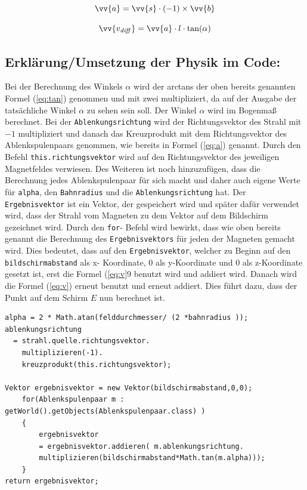 \begin{equation}
    \label{eq:a}
    \vv{a} = \vv{s} \cdot (-1) \times \vv{b}
\end{equation}

\begin{equation}
    \label{eq:v}
    \vv{v_\mathit{diff}} =  \vv{a} \cdot l \cdot \tan(\alpha)
\end{equation}

\subsection{Erklärung/Umsetzung der Physik im Code:}

Bei der Berechnung des Winkels $\alpha$ wird der arctans der oben bereits genannten Formel (\ref{eq:tan}) genommen und mit zwei multipliziert, da auf der Ausgabe der tatsächliche Winkel $\alpha$ zu sehen sein soll.
Der Winkel $\alpha$ wird im Bogenmaß berechnet.
Bei der \lstinline$Ablenkungsrichtung$ wird der Richtungsvektor des Strahl mit $-1$ multipliziert und danach das Kreuzprodukt mit dem Richtungsvektor des Ablenkspulenpaars genommen, wie bereits in Formel (\ref{eq:a}) genannt.
Durch den Befehl \lstinline$this.richtungsvektor$ wird auf den Richtungsvektor des jeweiligen Magnetfeldes verwiesen.
Des Weiteren ist noch hinzuzufügen, dass die Berechnung jedes Ablenkspulenpaar für sich macht und daher auch eigene Werte für \lstinline$alpha$, den \lstinline$Bahnradius$ und die \lstinline$Ablenkungsrichtung$ hat.
Der \lstinline$Ergebnisvektor$ ist ein Vektor, der gespeichert wird und später dafür verwendet wird, dass der Strahl vom Magneten zu dem Vektor auf dem Bildschirm gezeichnet wird.
Durch den \lstinline$for$- Befehl wird bewirkt, dass wie oben bereits genannt die Berechnung des \lstinline$Ergebnisvektors$ für jeden der Magneten gemacht wird.
Dies bedeutet, dass auf den \lstinline$Ergebnisvektor$, welcher zu Beginn auf den \lstinline$bildschirmabstand$ als x- Koordinate, $0$ als y-Koordinate und 0 als z-Koordinate gesetzt ist, erst die Formel (\ref{eq:v}9 benutzt wird und addiert wird.
Danach wird die Formel (\ref{eq:v}) erneut benutzt und erneut addiert. Dies führt dazu, dass der Punkt auf dem Schirm $E$ nun berechnet ist.

\begin{lstlisting}
alpha = 2 * Math.atan(felddurchmesser/ (2 *bahnradius ));
ablenkungsrichtung
  = strahl.quelle.richtungsvektor.
    multiplizieren(-1).
    kreuzprodukt(this.richtungsvektor);

Vektor ergebnisvektor = new Vektor(bildschirmabstand,0,0);
    for(Ablenkspulenpaar m : getWorld().getObjects(Ablenkspulenpaar.class) )
    {
        ergebnisvektor 
        = ergebnisvektor.addieren( m.ablenkungsrichtung.
        multiplizieren(bildschirmabstand*Math.tan(m.alpha)));
    }
return ergebnisvektor;

\end{lstlisting}

